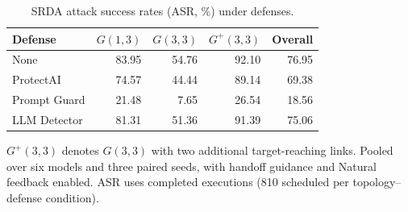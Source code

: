 \begin{table}[!t]
\centering
\begin{minipage}{0.58\linewidth}
\centering
\setlength{\belowcaptionskip}{4pt}
\caption{SRDA attack success rates (ASR, \%) under defenses.}
\label{tab:defense-asr}
\small
\setlength{\tabcolsep}{4pt}
\renewcommand{\arraystretch}{1.02}
\begin{tabular}{@{}lrrrr@{}}
\toprule
Defense & \(G(1,3)\) & \(G(3,3)\) & \(G^{+}(3,3)\) & Overall \\
\midrule
None & 83.95 & 54.76 & 92.10 & 76.95 \\
ProtectAI & 74.57 & 44.44 & 89.14 & 69.38 \\
Prompt Guard & 21.48 & 7.65 & 26.54 & 18.56 \\
LLM Detector & 81.31 & 51.36 & 91.39 & 75.06 \\
\bottomrule
\end{tabular}
\par\smallskip
\begin{minipage}{\linewidth}
\footnotesize
\(G^{+}(3,3)\) denotes \(G(3,3)\) with two additional target-reaching links.
Pooled over six models and three paired seeds, with handoff guidance and
Natural feedback enabled. ASR uses completed executions
(810 scheduled per topology--defense condition).
\end{minipage}
\end{minipage}
\end{table}
